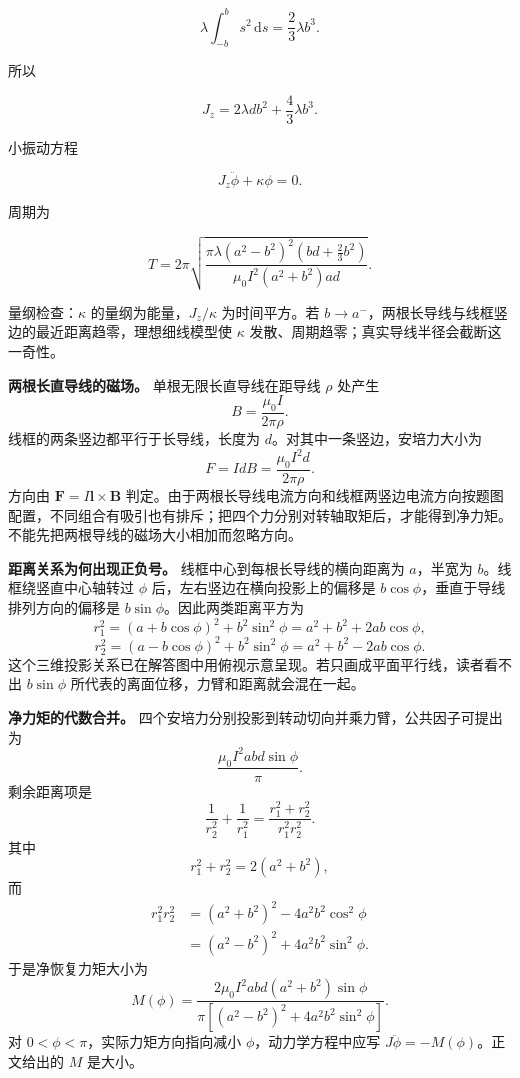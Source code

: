 \documentclass[12pt,a4paper,UTF8]{ctexart}
\begin{document}
\[
\lambda\int_{-b}^{b}s^2\,\mathrm ds
=\frac23\lambda b^3. \tag{19}
\]

所以

\[
J_z=2\lambda db^2+\frac43\lambda b^3. \tag{20}
\]

小振动方程

\[
J_z\ddot\phi+\kappa\phi=0. \tag{21}
\]

周期为

\[
\boxed{
T=2\pi
\sqrt{
\frac{\pi\lambda(a^2-b^2)^2
(bd+\frac23b^2)}
{\mu_0I^2(a^2+b^2)ad}
}}. \tag{22}
\]

量纲检查：\(\kappa\) 的量纲为能量，\(J_z/\kappa\) 为时间平方。若
\(b\to a^-\)，两根长导线与线框竖边的最近距离趋零，理想细线模型使
\(\kappa\) 发散、周期趋零；真实导线半径会截断这一奇性。

\textbf{两根长直导线的磁场。} 单根无限长直导线在距导线 \(\rho\) 处产生
\[
B=\frac{\mu_0I}{2\pi\rho}.
\] 线框的两条竖边都平行于长导线，长度为
\(d\)。对其中一条竖边，安培力大小为 \[
F=I d B
=\frac{\mu_0I^2d}{2\pi\rho}.
\] 方向由 \(\bm F=I\bm l\times\bm B\)
判定。由于两根长导线电流方向和线框两竖边电流方向按题图配置，不同组合有吸引也有排斥；把四个力分别对转轴取矩后，才能得到净力矩。不能先把两根导线的磁场大小相加而忽略方向。

\textbf{距离关系为何出现正负号。} 线框中心到每根长导线的横向距离为
\(a\)，半宽为 \(b\)。线框绕竖直中心轴转过 \(\phi\)
后，左右竖边在横向投影上的偏移是
\(b\cos\phi\)，垂直于导线排列方向的偏移是
\(b\sin\phi\)。因此两类距离平方为 \[
r_1^2=(a+b\cos\phi)^2+b^2\sin^2\phi
=a^2+b^2+2ab\cos\phi,
\] \[
r_2^2=(a-b\cos\phi)^2+b^2\sin^2\phi
=a^2+b^2-2ab\cos\phi.
\]
这个三维投影关系已在解答图中用俯视示意呈现。若只画成平面平行线，读者看不出
\(b\sin\phi\) 所代表的离面位移，力臂和距离就会混在一起。

\textbf{净力矩的代数合并。}
四个安培力分别投影到转动切向并乘力臂，公共因子可提出为 \[
\frac{\mu_0I^2abd\sin\phi}{\pi}.
\] 剩余距离项是 \[
\frac1{r_2^2}+\frac1{r_1^2}
=\frac{r_1^2+r_2^2}{r_1^2r_2^2}.
\] 其中 \[
r_1^2+r_2^2=2(a^2+b^2),
\] 而 \[
\begin{aligned}
r_1^2r_2^2
&=(a^2+b^2)^2-4a^2b^2\cos^2\phi\\
&=(a^2-b^2)^2+4a^2b^2\sin^2\phi.
\end{aligned}
\] 于是净恢复力矩大小为 \[
M(\phi)=
\frac{2\mu_0I^2abd(a^2+b^2)\sin\phi}
{\pi[(a^2-b^2)^2+4a^2b^2\sin^2\phi]}.
\] 对 \(0<\phi<\pi\)，实际力矩方向指向减小 \(\phi\)，动力学方程中应写
\(J\ddot\phi=-M(\phi)\)。正文给出的 \(M\) 是大小。
\end{document}
